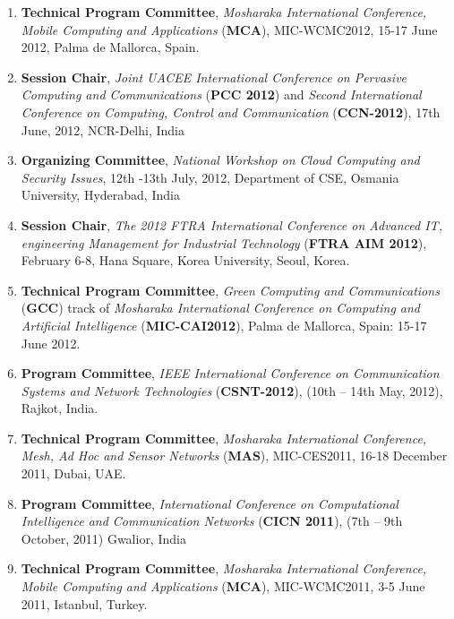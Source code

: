 \begin{enumerate} [label=(\arabic*).]
\item
\textbf{Technical Program Committee},\textit{ Mosharaka International Conference, Mobile Computing and Applications} (\textbf{MCA}), MIC-WCMC2012, 15-17 June 2012,  Palma de Mallorca, Spain.

\item
\textbf{Session Chair},\textit{ Joint UACEE International Conference on Pervasive Computing and Communications} (\textbf{PCC 2012}) and \textit{Second International Conference on Computing, Control and Communication }(\textbf{CCN-2012}), 17th June, 2012, NCR-Delhi, India

\item
\textbf{Organizing Committee}, \textit{National Workshop on Cloud Computing and Security Issues}, 12th -13th July, 2012, Department of CSE, Osmania University, Hyderabad, India

\item
\textbf{Session Chair}, \textit{The 2012 FTRA International Conference on Advanced IT, engineering Management for Industrial Technology} (\textbf{FTRA AIM 2012}), February 6-8, Hana Square, Korea University, Seoul, Korea.

\item
\textbf{Technical Program Committee}, \textit{Green Computing and Communications} (\textbf{GCC}) track of \textit{Mosharaka International Conference on Computing and Artificial Intelligence} (\textbf{MIC-CAI2012}), Palma de Mallorca, Spain: 15-17 June 2012. 

\item
\textbf{Program Committee}, \textit{IEEE International Conference on Communication Systems and Network Technologies} (\textbf{CSNT-2012}), (10th – 14th May, 2012), Rajkot, India.

\item
\textbf{Technical Program Committee}, \textit{Mosharaka International Conference, Mesh, Ad Hoc and Sensor Networks} (\textbf{MAS}), MIC-CES2011, 16-18 December 2011, Dubai, UAE.

\item
\textbf{Program Committee}, \textit{International Conference on Computational Intelligence and Communication Networks }(\textbf{CICN 2011}), (7th – 9th October, 2011) Gwalior, India

\item
\textbf{Technical Program Committee}, \textit{Mosharaka International Conference, Mobile Computing and Applications} (\textbf{MCA}), MIC-WCMC2011, 3-5 June 2011, Istanbul, Turkey.


\end{enumerate}
